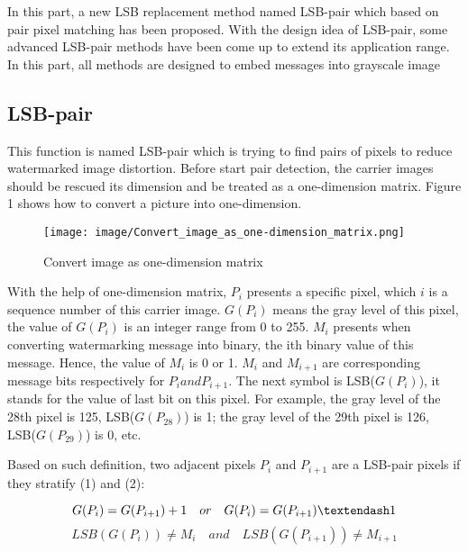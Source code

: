 \documentclass[%
    reprint,
    amsmath,amssymb,
    aps,
   ]{revtex4-1}
\begin{document}
   In this part, a new LSB replacement method named LSB-pair which based on pair pixel matching has been proposed. With the design idea of LSB-pair, some advanced LSB-pair methods have been come up to extend its application range. In this part, all methods are designed to embed messages into grayscale image
   
   
   \subsection{\label{sec:level2}LSB-pair}
   
   This function is named LSB-pair which is trying to find pairs of pixels to reduce watermarked image distortion. Before start pair detection, the carrier images should be rescued its dimension and be treated as a one-dimension matrix. Figure 1 shows how to convert a picture into one-dimension.
   
   \begin{figure}[H]
    \texttt{[image: image/Convert\_image\_as\_one-dimension\_matrix.png]}
    \caption{Convert image as one-dimension matrix}
    \label{fig:figure}
   \end{figure}
   
   With the help of one-dimension matrix, \(P_{i}\) presents a specific pixel, which \(i\) is a sequence number of this carrier image. \(G(P_{i})\) means the gray level of this pixel, the value of \(G(P_{i})\) is an integer range from 0 to 255. \(M_{i}\) presents when converting watermarking message into binary, the ith binary value of this message. Hence, the value of \(M_{i}\) is 0 or 1. \(M_{i}\) and \(M_{i+1}\) are corresponding message bits respectively for \(P_{i} and P_{i+1}\). The next symbol is LSB(\(G(P_{i})\)), it stands for the value of last bit on this pixel. For example, the gray level of the 28th pixel is 125, LSB(\(G(P_{28})\)) is 1; the gray level of the 29th pixel is 126, LSB(\(G(P_{29})\)) is 0, etc. 
   
   Based on such definition, two adjacent pixels \(P_{i}\) and \(P_{i+1}\) are a LSB-pair pixels if they stratify (1) and (2): 
   
   \begin{equation}
   \\ G(P_{i}) = G(P_{i+1}) + 1 \quad or \quad G(P_{i}) = G(P_{i+1}) – 1
   \end{equation}
   \begin{equation}
   LSB(G(P_{i})) \neq M_{i} \quad and \quad LSB(G(P_{i+1})) \neq M_{i+1}
   \end{equation}
   
\end{document}
